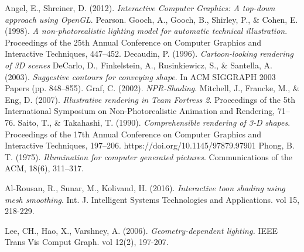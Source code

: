 \begin{thebibliography}{9}
Angel, E., Shreiner, D. (2012). \emph{Interactive Computer Graphics: A top-down approach using OpenGL}. Pearson. 
Gooch, A., Gooch, B., Shirley, P., \& Cohen, E. (1998). \emph{A non-photorealistic lighting model for automatic technical illustration}. Proceedings of the 25th Annual Conference on Computer Graphics and Interactive Techniques, 447–452.
Decaudin, P. (1996). \emph{Cartoon-looking rendering of 3D scenes}
DeCarlo, D., Finkelstein, A., Rusinkiewicz, S., \& Santella, A. (2003). \emph{Suggestive contours for conveying shape}. In ACM SIGGRAPH 2003 Papers (pp. 848–855).
Graf, C. (2002). \emph{NPR-Shading}.
Mitchell, J., Francke, M., \& Eng, D. (2007). \emph{Illustrative rendering in Team Fortress 2}. Proceedings of the 5th International Symposium on Non-Photorealistic Animation and Rendering, 71–76.
Saito, T., \& Takahashi, T. (1990). \emph{Comprehensible rendering of 3-D shapes}. Proceedings of the 17th Annual Conference on Computer Graphics and Interactive Techniques, 197–206. https://doi.org/10.1145/97879.97901
Phong, B. T. (1975). \emph{Illumination for computer generated pictures}. Communications of the ACM, 18(6), 311–317.

Al-Rousan, R., Sunar, M., Kolivand, H. (2016).  \emph{Interactive toon shading using mesh smoothing}. Int. J. Intelligent Systems Technologies and Applications. vol 15, 218-229.

Lee, CH., Hao, X., Varshney, A. (2006). \emph{Geometry-dependent lighting.} IEEE Trans Vis Comput Graph. vol 12(2), 197-207. 
\end{thebibliography}
